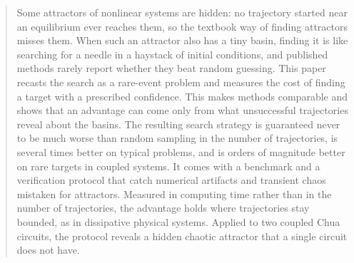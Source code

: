\begin{quotation}
Some attractors of nonlinear systems are hidden: no trajectory started near an equilibrium ever reaches them, so the textbook way of finding attractors misses them. When such an attractor also has a tiny basin, finding it is like searching for a needle in a haystack of initial conditions, and published methods rarely report whether they beat random guessing. This paper recasts the search as a rare-event problem and measures the cost of finding a target with a prescribed confidence. This makes methods comparable and shows that an advantage can come only from what unsuccessful trajectories reveal about the basins. The resulting search strategy is guaranteed never to be much worse than random sampling in the number of trajectories, is several times better on typical problems, and is orders of magnitude better on rare targets in coupled systems. It comes with a benchmark and a verification protocol that catch numerical artifacts and transient chaos mistaken for attractors. Measured in computing time rather than in the number of trajectories, the advantage holds where trajectories stay bounded, as in dissipative physical systems. Applied to two coupled Chua circuits, the protocol reveals a hidden chaotic attractor that a single circuit does not have.
\end{quotation}
